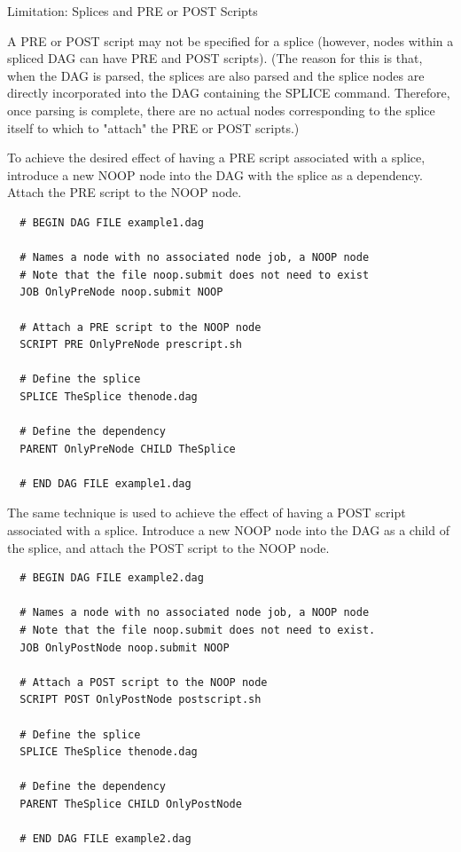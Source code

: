 \begin{description}
\item[Limitation: Splices and PRE or POST Scripts]
\end{description}

A PRE or POST script may not be specified for a splice (however, nodes
within a spliced DAG can have PRE and POST scripts).
(The reason for this is that, when the DAG is parsed, the splices
are also parsed and the splice nodes are directly incorporated into
the DAG containing the SPLICE command.  Therefore, once parsing is
complete, there are no actual nodes corresponding to the splice
itself to which to "attach" the PRE or POST scripts.)

To achieve the desired effect of having a PRE script associated with a splice,
introduce a new NOOP node into the DAG with the splice as a dependency.
Attach the PRE script to the NOOP node.
\footnotesize
\begin{verbatim}
  # BEGIN DAG FILE example1.dag

  # Names a node with no associated node job, a NOOP node
  # Note that the file noop.submit does not need to exist
  JOB OnlyPreNode noop.submit NOOP

  # Attach a PRE script to the NOOP node
  SCRIPT PRE OnlyPreNode prescript.sh

  # Define the splice
  SPLICE TheSplice thenode.dag
 
  # Define the dependency
  PARENT OnlyPreNode CHILD TheSplice

  # END DAG FILE example1.dag
\end{verbatim}
\normalsize

The same technique is used to achieve the effect of having a POST script
associated with a splice.
Introduce a new NOOP node into the DAG as a child of the splice, 
and attach the POST script to the NOOP node.

\footnotesize
\begin{verbatim}
  # BEGIN DAG FILE example2.dag

  # Names a node with no associated node job, a NOOP node
  # Note that the file noop.submit does not need to exist.
  JOB OnlyPostNode noop.submit NOOP

  # Attach a POST script to the NOOP node
  SCRIPT POST OnlyPostNode postscript.sh

  # Define the splice
  SPLICE TheSplice thenode.dag
 
  # Define the dependency
  PARENT TheSplice CHILD OnlyPostNode

  # END DAG FILE example2.dag
\end{verbatim}
\normalsize

